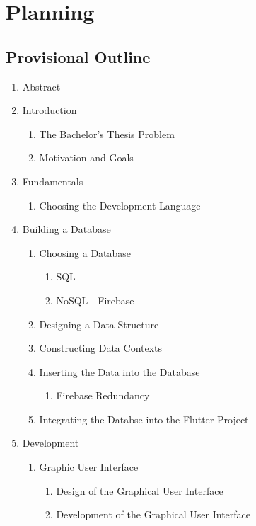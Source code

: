 \chapter{Planning}

\section{Provisional Outline}
\begin{enumerate}
	\item Abstract
	\item Introduction
		\begin{enumerate}
		\item The Bachelor's Thesis Problem
		\item Motivation and Goals
		\end{enumerate}
	\item Fundamentals
		\begin{enumerate}
		\item Choosing the Development Language
		\end{enumerate}
	\item Building a Database
	\begin{enumerate}
		\item Choosing a Database
		\begin{enumerate}
			\item SQL
			\item NoSQL - Firebase
		\end{enumerate}
		\item Designing a Data Structure
		\item Constructing Data Contexts
		\item Inserting the Data into the Database
			\begin{enumerate}
				\item Firebase Redundancy
			\end{enumerate}
		\item Integrating the Databse into the Flutter Project

	\end{enumerate}
	\item Development
		\begin{enumerate}
		\item Graphic User Interface
			\begin{enumerate}
			\item Design of the Graphical User Interface
			\item Development of the Graphical User Interface
			\end{enumerate}


\end{enumerate}
\end{enumerate}
